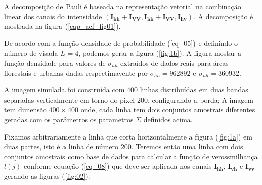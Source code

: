 \documentclass[conference]{IEEEtran}
\begin{document}
   

A decomposição de Pauli é baseada na representação vetorial na combinação linear dos canais do intensidade $(\mathbf{I_{hh}+I_{VV}}, \mathbf{I_{hh}+I_{VV}}, \mathbf{I_{hv}})$. A decomposição é mostrada na figura (\ref{cap_acf_fig01}). 

De acordo com a função densidade de probabilidade (\ref{eq_05}) e definindo o número de visada $L=4$, podemos gerar a figura (\ref{fig:1b}). A figura mostar a função densidade para valores de $\sigma_{hh}$ extraídos de dados reais para áreas florestais e urbanas dadas respectimavente por $\sigma_{hh}=962892$ e $\sigma_{hh}= 360932$. 

A imagem simulada foi construída com $400$ linhas distribuídas em duas bandas separadas verticalmente em torno do pixel $200$, configurando a borda; A imagem tem dimensão $400 \times 400$ onde, cada linha  tem dois conjuntos amostrais diferentes geradas com os parâmetros os parametros $\Sigma$ definidos acima.  

	Fixamos arbitrariamente a linha que corta horizontalmente a figura (\ref{fig:1a}) em duas partes, isto é a linha de número $200$. Teremos então uma linha com dois conjuntos amostrais como base de dados para calcular a função de verossmilhança $l(j)$ conforme equação (\ref{eq_08}) que deve ser aplicada nos canais $\mathbf{I_{hh}}$, $\mathbf{I_{vh}}$ e $\mathbf{I_{vv}}$ gerando as figuras (\ref{fig:02}).  
\end{document}
